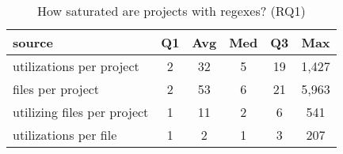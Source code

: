 \begin{table}[tb]
\begin{center}
\caption{How saturated are projects with regexes? (RQ1)}
\label{table:saturation}
\begin{small}
\begin{tabular}{l|ccccc}
\toprule
source & Q1 & Avg & Med & Q3 & Max \\ 
\midrule
utilizations per project & 2 & 32 & 5 & 19 & 1,427 \\ 
\midrule
files per project & 2 & 53 & 6 & 21 & 5,963 \\ 
\midrule
utilizing files per project & 1 & 11 & 2 & 6 & 541 \\ 
\midrule
utilizations per file & 1 & 2 & 1 & 3 & 207 \\ 
\bottomrule
\end{tabular}
\end{small}
\end{center}
\end{table}
